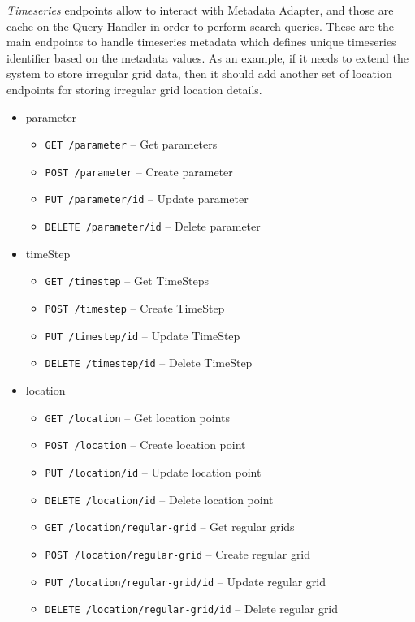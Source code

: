 \emph{Timeseries} endpoints allow to interact with Metadata Adapter, and those are cache on the Query Handler in order to perform search queries. These are the main endpoints to handle timeseries metadata which defines unique timeseries identifier based on the metadata values. As an example, if it needs to extend the system to store irregular grid data, then it should add another set of location endpoints for storing irregular grid location details.
\begin{itemize}
    \item parameter
    \begin{itemize}
        \item \texttt{GET /parameter} -- Get parameters
        \item \texttt{POST /parameter} -- Create parameter
        \item \texttt{PUT /parameter/id} -- Update parameter
        \item \texttt{DELETE /parameter/id} -- Delete parameter
    \end{itemize}
    \item timeStep
    \begin{itemize}
        \item \texttt{GET /timestep} -- Get TimeSteps
        \item \texttt{POST /timestep} -- Create TimeStep
        \item \texttt{PUT /timestep/id} -- Update TimeStep
        \item \texttt{DELETE /timestep/id} -- Delete TimeStep
    \end{itemize}
    \item location
    \begin{itemize}
        \item \texttt{GET /location} -- Get location points
        \item \texttt{POST /location} -- Create location point
        \item \texttt{PUT /location/id} -- Update location point
        \item \texttt{DELETE /location/id} -- Delete location point
        \item \texttt{GET /location/regular-grid} -- Get regular grids
        \item \texttt{POST /location/regular-grid} -- Create regular grid
        \item \texttt{PUT /location/regular-grid/id} -- Update regular grid
        \item \texttt{DELETE /location/regular-grid/id} -- Delete regular grid

\end{itemize}
\end{itemize}
